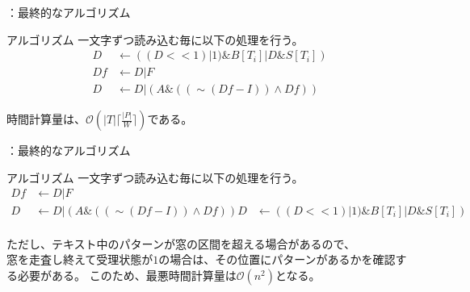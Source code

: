 \documentclass[dvipdfmx,12pt,beamer]{standalone}
\begin{document}
\begin{frame}{\ShiftAnd：最終的なアルゴリズム}
	\begin{block}{アルゴリズム}	
		一文字ずつ読み込む毎に以下の処理を行う。
		\begin{align*}
			D &\leftarrow ((D << 1) | 1) \& B[T_i] | D \& S[T_i])\\
			Df &\leftarrow D | F \\
			D &\leftarrow D | (A \& ((\sim (Df - I)) \land Df))
		\end{align*}
	\end{block}

	時間計算量は、$\mathcal{O}{(|T|	\lceil\frac{|P|}{W}\rceil)}$である。

\end{frame}

\begin{frame}{\BNDM：最終的なアルゴリズム}
	\begin{block}{アルゴリズム}	
		一文字ずつ読み込む毎に以下の処理を行う。
		\begin{align*}
			Df &\leftarrow D | F \\
			D &\leftarrow D | (A \& ((\sim (Df - I)) \land Df))
			D &\leftarrow ((D << 1) | 1) \& B[T_i] | D \& S[T_i])\\
		\end{align*}
	\end{block}

	ただし、テキスト中のパターンが窓の区間を超える場合があるので、\\
	窓を走査し終えて受理状態が$1$の場合は、その位置にパターンがあるかを確認する必要がある。
	このため、最悪時間計算量は$\mathcal{O}{(n^2)}$となる。

\end{frame}
\end{document}
